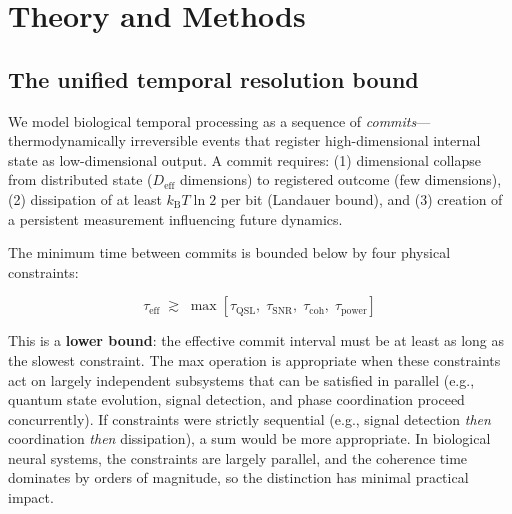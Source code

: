 \documentclass[12pt]{article}
\newcommand{\kB}{k_{\mathrm{B}}}
\newcommand{\Deff}{D_{\mathrm{eff}}}
\begin{document}
\section{Theory and Methods}

\subsection{The unified temporal resolution bound}

We model biological temporal processing as a sequence of \emph{commits}---thermodynamically irreversible events that register high-dimensional internal state as low-dimensional output. A commit requires: (1) dimensional collapse from distributed state ($\Deff$ dimensions) to registered outcome (few dimensions), (2) dissipation of at least $\kB T \ln 2$ per bit (Landauer bound), and (3) creation of a persistent measurement influencing future dynamics.

The minimum time between commits is bounded below by four physical constraints:

\begin{equation}\label{eq:main-bound}
\boxed{\tau_{\mathrm{eff}} \;\gtrsim\; \max\left[\tau_{\mathrm{QSL}},\; \tau_{\mathrm{SNR}},\; \tau_{\mathrm{coh}},\; \tau_{\mathrm{power}}\right]}
\end{equation}

This is a \textbf{lower bound}: the effective commit interval must be at least as long as the slowest constraint. The max operation is appropriate when these constraints act on largely independent subsystems that can be satisfied in parallel (e.g., quantum state evolution, signal detection, and phase coordination proceed concurrently). If constraints were strictly sequential (e.g., signal detection \emph{then} coordination \emph{then} dissipation), a sum would be more appropriate. In biological neural systems, the constraints are largely parallel, and the coherence time dominates by orders of magnitude, so the distinction has minimal practical impact.
\end{document}
